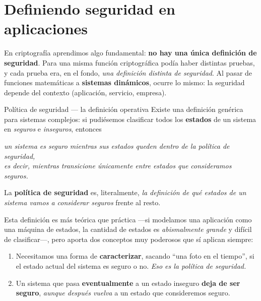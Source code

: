 \documentclass[11pt,a4paper]{article}
\begin{document}
\tableofcontents
\newpage

\section{Definiendo seguridad en aplicaciones}

En criptografía aprendimos algo fundamental: \textbf{no hay una única definición de
seguridad}. Para una misma función criptográfica podía haber distintas pruebas, y cada prueba
era, en el fondo, \emph{una definición distinta de seguridad}. Al pasar de funciones
matemáticas a \textbf{sistemas dinámicos}, ocurre lo mismo: la seguridad depende del contexto
(aplicación, servicio, empresa).

\begin{defbox}{Política de seguridad — la definición operativa}
Existe una definición genérica para sistemas complejos: si pudiésemos clasificar todos los
\textbf{estados} de un sistema en \emph{seguros} e \emph{inseguros}, entonces
\begin{center}\itshape
un sistema es seguro mientras sus estados queden dentro de la política de seguridad,\\
es decir, mientras transicione únicamente entre estados que consideramos seguros.
\end{center}
La \textbf{política de seguridad} es, literalmente, \emph{la definición de qué estados de un
sistema vamos a considerar seguros} frente al resto.
\end{defbox}

Esta definición es más teórica que práctica —si modelamos una aplicación como una máquina de
estados, la cantidad de estados es \emph{abismalmente grande} y difícil de clasificar—, pero
aporta dos conceptos muy poderosos que sí aplican siempre:

\begin{enumerate}[leftmargin=1.6em,itemsep=2pt]
  \item Necesitamos una forma de \textbf{caracterizar}, sacando ``una foto en el tiempo'',
        si el estado actual del sistema es seguro o no. \emph{Eso es la política de seguridad.}
  \item Un sistema que pasa \textbf{eventualmente} a un estado inseguro \textbf{deja de ser
        seguro}, \emph{aunque después vuelva} a un estado que consideremos seguro.
\end{enumerate}
\end{document}
